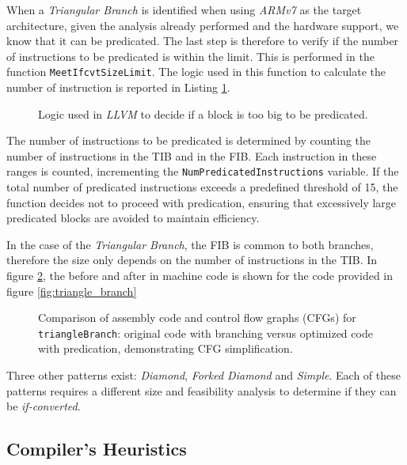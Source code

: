 When a \textit{Triangular Branch} is identified when using \textit{ARMv7} as the target architecture, given the analysis already performed and the hardware support, we know that it can be predicated. The last step is therefore to verify if the number of instructions to be predicated is within the limit. This is performed in the function \texttt{MeetIfcvtSizeLimit}. The logic used in this function to calculate the number of instruction is reported in Listing \ref{fig:predication_size}.

\begin{figure}[H]
    \centering
    
    \caption{Logic used in \textit{LLVM} to decide if a block is too big to be predicated.}
    \label{fig:predication_size}
\end{figure}

The number of instructions to be predicated is determined by counting the number of instructions in the TIB and in the FIB. Each instruction in these ranges is counted, incrementing the \texttt{NumPredicatedInstructions} variable. If the total number of predicated instructions exceeds a predefined threshold of 15, the function decides not to proceed with predication, ensuring that excessively large predicated blocks are avoided to maintain efficiency.

In the case of the \textit{Triangular Branch}, the FIB is common to both branches, therefore the size only depends on the number of instructions in the TIB. In figure \ref{fig:triangle_asm}, the before and after in machine code is shown for the code provided in figure \ref{fig:triangle_branch}

\begin{figure}[H]
    \centering
    
    \caption[TriangleBranch Comparison]{Comparison of assembly code and control flow graphs (CFGs) for \texttt{triangleBranch}: original code with branching versus optimized code with predication, demonstrating CFG simplification.}
    \label{fig:triangle_asm}
\end{figure}


Three other patterns exist: \textit{Diamond}, \textit{Forked Diamond} and \textit{Simple}. Each of these patterns requires a different size and feasibility analysis to determine if they can be \textit{if-converted}.

\subsection{Compiler's Heuristics}
\label{sec:compiler_heuristics}

